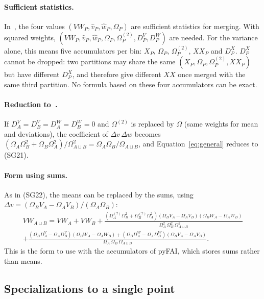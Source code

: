 \documentclass[a4paper,11pt]{article}
\newcommand{\mean}[1]{\widehat{#1}}
\newcommand{\Om}{\Omega}
\newcommand{\OmS}{\Omega^{(2)}}
\newcommand{\D}[2]{D^{#1}_{#2}}
\newcommand{\AB}{{A\sqcup B}}
\begin{document}
\paragraph{Sufficient statistics.}
In~\cite{SG18}, the four values $(VW_P, \mean{v}_P, \mean{w}_P, \Om_P)$ are sufficient statistics for
merging. With squared weights, $(VW_P, \mean{v}_P, \mean{w}_P, \Om_P, \OmS_P, \D{V}{P}, \D{W}{P})$ are
needed. For the variance alone, this means five accumulators per bin: $X_P$, $\Om_P$, $\OmS_P$, $XX_P$ and
$\D{X}{P}$. $\D{X}{P}$ cannot be dropped: two partitions may share the same
$(X_P, \Om_P, \OmS_P, XX_P)$ but have different $\D{X}{P}$, and therefore give different $XX$ once merged
with the same third partition. No formula based on these four accumulators can be exact.

\paragraph{Reduction to~\cite{SG18}.}
If $\D{V}{A}=\D{V}{B}=\D{W}{A}=\D{W}{B}=0$ and $\OmS$ is replaced by $\Om$ (same weights for mean and
deviations), the coefficient of $\Delta v\,\Delta w$ becomes
$(\Om_A\Om_B^2+\Om_B\Om_A^2)/\Om_\AB^2 = \Om_A\Om_B/\Om_\AB$, and Equation~\eqref{eq:general} reduces to (SG21).

\paragraph{Form using sums.}
As in (SG22), the means can be replaced by the sums, using
$\Delta v = (\Om_B V_A - \Om_A V_B)/(\Om_A\Om_B)$:
\begin{multline}
  VW_\AB = VW_A + VW_B
   + \frac{\left(\OmS_A\Om_B^2+\OmS_B\Om_A^2\right)\left(\Om_B V_A-\Om_A V_B\right)\left(\Om_B W_A-\Om_A W_B\right)}{\Om_A^2\,\Om_B^2\,\Om_\AB^2}\\
   + \frac{\left(\Om_B\D{V}{A}-\Om_A\D{V}{B}\right)\left(\Om_B W_A-\Om_A W_B\right)
          + \left(\Om_B\D{W}{A}-\Om_A\D{W}{B}\right)\left(\Om_B V_A-\Om_A V_B\right)}{\Om_A\,\Om_B\,\Om_\AB}.
  \label{eq:sums}
\end{multline}
This is the form to use with the accumulators of pyFAI, which stores sums rather than means.

\subsection{Specializations to a single point}
\end{document}
